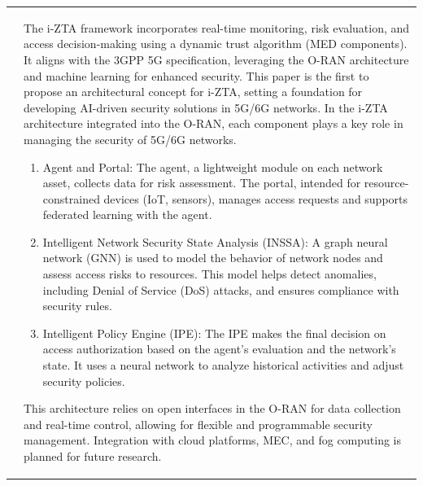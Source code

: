 \documentclass{report}
\begin{document}
\begin{longtable}{|p{4cm}|p{12cm}|}
    \cite{izta} & 
    \parbox[t]{12cm}{
        The i-ZTA framework incorporates real-time monitoring, risk evaluation, and access decision-making using a dynamic trust algorithm (MED components). It aligns with the 3GPP 5G specification, leveraging the O-RAN architecture and machine learning for enhanced security. This paper is the first to propose an architectural concept for i-ZTA, setting a foundation for developing AI-driven security solutions in 5G/6G networks. In the i-ZTA architecture integrated into the O-RAN, each component plays a key role in managing the security of 5G/6G networks. 
        \begin{enumerate}
            \item Agent and Portal: The agent, a lightweight module on each network asset, collects data for risk assessment. The portal, intended for resource-constrained devices (IoT, sensors), manages access requests and supports federated learning with the agent.
            \item Intelligent Network Security State Analysis (INSSA): A graph neural network (GNN) is used to model the behavior of network nodes and assess access risks to resources. This model helps detect anomalies, including Denial of Service (DoS) attacks, and ensures compliance with security rules.
            \item Intelligent Policy Engine (IPE): The IPE makes the final decision on access authorization based on the agent's evaluation and the network's state. It uses a neural network to analyze historical activities and adjust security policies.
        \end{enumerate}
        This architecture relies on open interfaces in the O-RAN for data collection and real-time control, allowing for flexible and programmable security management. Integration with cloud platforms, MEC, and fog computing is planned for future research.
    } \\ 
    \hline


\end{longtable}
\end{document}
